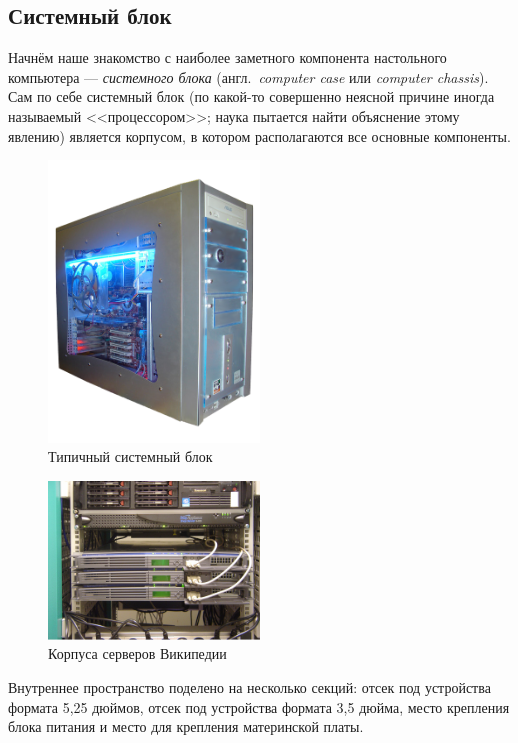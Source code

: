 \subsection{Системный блок}\label{base:introduction:components:case}
Начнём наше знакомство с наиболее заметного компонента настольного компьютера --- \emph{системного блока} (англ.~\emph{computer case} или \emph{computer chassis}). Сам по себе системный блок (по какой-то совершенно неясной причине иногда называемый <<процессором>>; наука пытается найти объяснение этому явлению) является корпусом, в котором располагаются все основные компоненты.
\begin{figure}[h!]
 \centering
 \includegraphics[width=0.5\textwidth]{base/Introduction/Case.png}
 \caption{Типичный системный блок}
 \label{base:introduction:components:case:typicalcasepic}
\end{figure}
\begin{figure}[h!]
 \centering
 \includegraphics[width=0.5\textwidth]{base/Introduction/Case_wikipedia.jpg}
 \caption{Корпуса серверов Википедии}
 \label{base:introduction:components:case:wikipediacasepic}
\end{figure}
Внутреннее пространство поделено на несколько секций: отсек под устройства формата 5,25 дюймов, отсек под устройства формата 3,5 дюйма, место крепления блока питания и место для крепления материнской платы.

